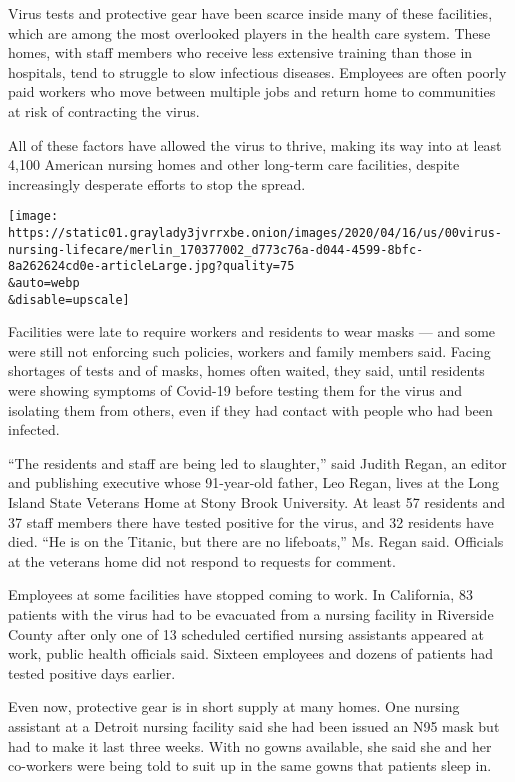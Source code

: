 Virus tests and protective gear have been scarce inside many of these
facilities, which are among the most overlooked players in the health
care system. These homes, with staff members who receive less extensive
training than those in hospitals, tend to struggle to slow infectious
diseases. Employees are often poorly paid workers who move between
multiple jobs and return home to communities at risk of contracting the
virus.

All of these factors have allowed the virus to thrive, making its way
into at least 4,100 American nursing homes and other long-term care
facilities, despite increasingly desperate efforts to stop the spread.

\texttt{[image: https://static01.graylady3jvrrxbe.onion/images/2020/04/16/us/00virus-nursing-lifecare/merlin\_170377002\_d773c76a-d044-4599-8bfc-8a262624cd0e-articleLarge.jpg?quality=75\\\&auto=webp\\\&disable=upscale]}

Facilities were late to require workers and residents to wear masks ---
and some were still not enforcing such policies, workers and family
members said. Facing shortages of tests and of masks, homes often
waited, they said, until residents were showing symptoms of Covid-19
before testing them for the virus and isolating them from others, even
if they had contact with people who had been infected.

``The residents and staff are being led to slaughter,'' said Judith
Regan, an editor and publishing executive whose 91-year-old father, Leo
Regan, lives at the Long Island State Veterans Home at Stony Brook
University. At least 57 residents and 37 staff members there have tested
positive for the virus, and 32 residents have died. ``He is on the
Titanic, but there are no lifeboats,'' Ms. Regan said. Officials at the
veterans home did not respond to requests for comment.

Employees at some facilities have stopped coming to work. In California,
83 patients with the virus had to be evacuated from a nursing facility
in Riverside County after only one of 13 scheduled certified nursing
assistants appeared at work, public health officials said. Sixteen
employees and dozens of patients had tested positive days earlier.

Even now, protective gear is in short supply at many homes. One nursing
assistant at a Detroit nursing facility said she had been issued an N95
mask but had to make it last three weeks. With no gowns available, she
said she and her co-workers were being told to suit up in the same gowns
that patients sleep in.

